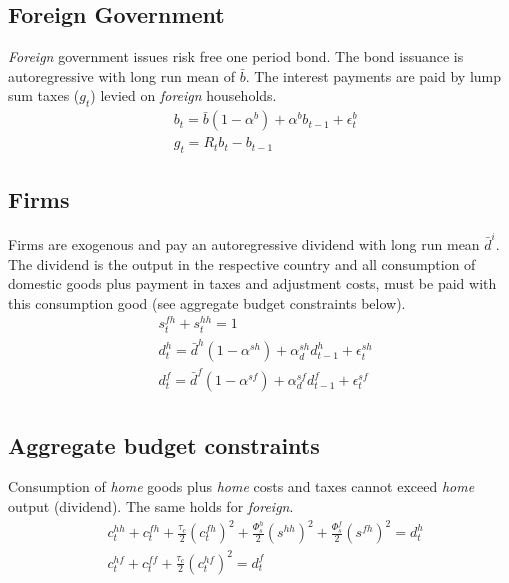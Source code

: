 \documentclass[a4paper]{article}
\begin{document}
\subsection{Foreign Government}
\emph{Foreign} government issues risk free one period bond. The bond issuance is autoregressive with long run mean of $\bar b$. The interest payments are paid by lump sum taxes ($g_t$) levied on \emph{foreign} households.
\begin{align}
&b_{t} = \bar b(1-\alpha^b) + \alpha^b b_{t-1} + \epsilon^b_t\\
&g_t	   = R_t b_{t}-b_{t-1}
\end{align}


\subsection{Firms}
Firms are exogenous and pay an autoregressive dividend with long run mean $\bar d^i$. The dividend is the output in the respective country and all consumption of domestic goods plus payment in taxes and adjustment costs, must be paid with this consumption good (see aggregate budget constraints below).
\begin{align}
&s^{fh}_t+s^{hh}_t=1\\
&d^h_t=\bar d^h (1-\alpha^{sh}) +\alpha^{sh}_d d^h_{t-1} + \epsilon^{sh}_{t}\\
&d^f_t=\bar d^f (1-\alpha^{sf}) +\alpha^{sf}_d d^f_{t-1} + \epsilon^{sf}_{t}\\
\end{align}

\subsection{Aggregate budget constraints}
Consumption of \emph{home} goods plus \emph{home} costs and taxes cannot exceed \emph{home} output (dividend). The same holds for \emph{foreign}.
\begin{align}
&c^{hh}_t+c^{fh}_t + \frac{\tau_c}{2} (c^{fh}_t)^2 +\frac{\Phi^{h}_s}{2}(s^{hh})^2 + \frac{\Phi^f_s}{2}(s^{fh})^2 =d^h_t \label{aggregatebc} \\
&c^{hf}_t + c^{ff}_t + \frac{\tau_c}{2} (c^{hf}_t)^2 = d^f_t \label{aggregatebcc}
\end{align}
\end{document}
